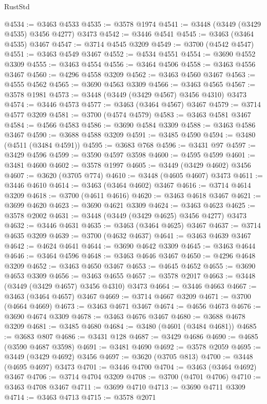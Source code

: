 \begin{lexlean}{RustStd}
\begin{coremodule}
{\begin{coremodule}
{{{{{{{{{{{{{{{{{{{{{{{{{{{{{{{{{{{{{{{{{{{{{{{{{{{{{{{{{{{{{{{{{{{{{{{{{{{{{{{{{{{{{@4534 := @3463 @4533
@4535 := @3578 @1974
@4541 := @3448 (@3449 (@3429 @4535) @3456 @4277) @3473
@4542 := @3446 @4541
@4545 := @3463 (@3464 @4535) @3467
@4547 := @3714 @4545 @3209
@4549 := @3700 (@4542 @4547)
@4551 := @3463 @4549 @3467
@4552 := @4534 @4551
@4554 := @3690 @4552 @3309
@4555 := @3463 @4554
@4556 := @3464 @4506
@4558 := @3463 @4556 @3467
@4560 := @4296 @4558 @3209
@4562 := @3463 @4560 @3467
@4563 := @4555 @4562
@4565 := @3690 @4563 @3309
@4566 := @3463 @4565
@4567 := @3578 @1981
@4573 := @3448 (@3449 (@3429 @4567) @3456 @4310) @3473
@4574 := @3446 @4573
@4577 := @3463 (@3464 @4567) @3467
@4579 := @3714 @4577 @3209
@4581 := @3700 (@4574 @4579)
@4583 := @3463 @4581 @3467
@4584 := @4566 @4583
@4586 := @3690 @4584 @3309
@4588 := @3463 @4586 @3467
@4590 := @3688 @4588 @3209
@4591 := @3485 @4590
@4594 := @3480 (@4511 (@3484 @4591))
@4595 := @3683 @768
@4596 := @3431 @97
@4597 := @3429 @4596
@4599 := @3590 @4597 @3598
@4600 := @4595 @4599
@4601 := @3481 @4600
@4602 := @3578 @1997
@4605 := @3449 (@3429 @4602) @3456
@4607 := @3620 (@3705 @774)
@4610 := @3448 (@4605 @4607) @3473
@4611 := @3446 @4610
@4614 := @3463 (@3464 @4602) @3467
@4616 := @3714 @4614 @3209
@4618 := @3700 (@4611 @4616)
@4620 := @3463 @4618 @3467
@4621 := @3699 @4620
@4623 := @3690 @4621 @3309
@4624 := @3463 @4623
@4625 := @3578 @2002
@4631 := @3448 (@3449 (@3429 @4625) @3456 @4277) @3473
@4632 := @3446 @4631
@4635 := @3463 (@3464 @4625) @3467
@4637 := @3714 @4635 @3209
@4639 := @3700 (@4632 @4637)
@4641 := @3463 @4639 @3467
@4642 := @4624 @4641
@4644 := @3690 @4642 @3309
@4645 := @3463 @4644
@4646 := @3464 @4596
@4648 := @3463 @4646 @3467
@4650 := @4296 @4648 @3209
@4652 := @3463 @4650 @3467
@4653 := @4645 @4652
@4655 := @3690 @4653 @3309
@4656 := @3463 @4655
@4657 := @3578 @2017
@4663 := @3448 (@3449 (@3429 @4657) @3456 @4310) @3473
@4664 := @3446 @4663
@4667 := @3463 (@3464 @4657) @3467
@4669 := @3714 @4667 @3209
@4671 := @3700 (@4664 @4669)
@4673 := @3463 @4671 @3467
@4674 := @4656 @4673
@4676 := @3690 @4674 @3309
@4678 := @3463 @4676 @3467
@4680 := @3688 @4678 @3209
@4681 := @3485 @4680
@4684 := @3480 (@4601 (@3484 @4681))
@4685 := @3683 @807
@4686 := @3431 @128
@4687 := @3429 @4686
@4690 := @4685 (@3590 @4687 @3598)
@4691 := @3481 @4690
@4692 := @3578 @2059
@4695 := @3449 (@3429 @4692) @3456
@4697 := @3620 (@3705 @813)
@4700 := @3448 (@4695 @4697) @3473
@4701 := @3446 @4700
@4704 := @3463 (@3464 @4692) @3467
@4706 := @3714 @4704 @3209
@4708 := @3700 (@4701 @4706)
@4710 := @3463 @4708 @3467
@4711 := @3699 @4710
@4713 := @3690 @4711 @3309
@4714 := @3463 @4713
@4715 := @3578 @2071
}}}}}}}}}}}}}}}}}}}}}}}}}}}}}}}}}}}}}}}}}}}}}}}}}}}}}}}}}}}}}}}}}}}}}}}}}}}}}}}}}}}}}
\end{coremodule}}
\end{coremodule}
\end{lexlean}
